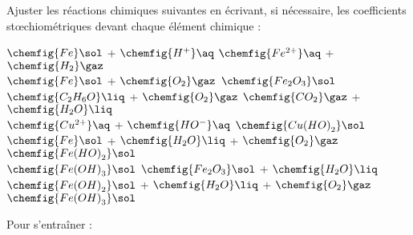 
\numeroQuestion
Ajuster les réactions chimiques suivantes en écrivant, si nécessaire, les coefficients stœchiométriques devant chaque élément chimique :
\newcommand{\localEcart}{16}
\begin{center}
   $\chemfig{Fe}\sol$ +  $\chemfig{H^{+}}\aq$
  \reaction {} $\chemfig{Fe^{2+}}\aq$ +  $\chemfig{H_2}\gaz$
  \\[\localEcart pt]
   $\chemfig{Fe}\sol$ +  $\chemfig{O_2}\gaz$
  \reaction {} $\chemfig{Fe_2O_3}\sol$
  \\[\localEcart pt]
   $\chemfig{C_2H_6O}\liq$ +  $\chemfig{O_2}\gaz$
  \reaction {} $\chemfig{CO_2}\gaz$ +  $\chemfig{H_2O}\liq$
  \\[\localEcart pt]
   $\chemfig{Cu^{2+}}\aq$ +  $\chemfig{HO^{-}}\aq$
  \reaction {} $\chemfig{Cu{(HO)}_2}\sol$
  \\[\localEcart pt]
   $\chemfig{Fe}\sol$ +  $\chemfig{H_2O}\liq$ +  $\chemfig{O_2}\gaz$
  \reaction {} $\chemfig{Fe{(HO)}_2}\sol$
  \\[\localEcart pt]
   $\chemfig{Fe{(OH)}_3}\sol$
  \reaction {} $\chemfig{Fe_2O_3}\sol$ +  $\chemfig{H_2O}\liq$
  \\[\localEcart pt]
   $\chemfig{Fe{(OH)}_2}\sol$ +  $\chemfig{H_2O}\liq$ +  $\chemfig{O_2}\gaz$
  \reaction {} $\chemfig{Fe{(OH)}_3}\sol$
  \\[\localEcart pt]
\end{center}

\begin{wrapfigure}{r}{0.1\linewidth}
  \centering
\end{wrapfigure}
\numeroQuestion Pour s'entraîner :